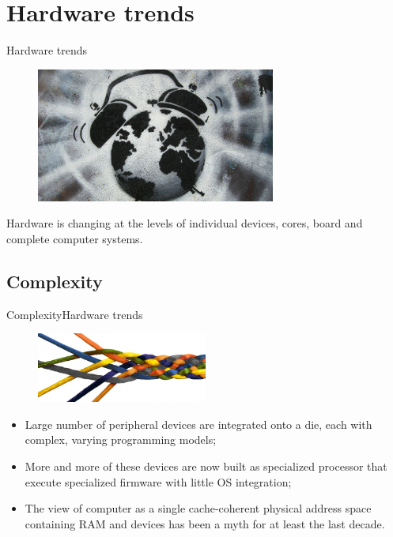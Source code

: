 \documentclass[10pt]{beamer}
\begin{document}
\section{Hardware trends}
\begin{frame}{Hardware trends}

  \begin{figure}[ht]
    \includegraphics[width=0.7\textwidth, keepaspectratio=true]{images/hwAndAppChangeFast.png}
  \end{figure}\pause

  \begin{block}{}
  Hardware is changing at the levels of individual devices, cores, board and
  complete computer systems.
  \end{block}

\end{frame}
\subsection{Complexity}

\begin{frame}{Complexity}{Hardware trends}

  \begin{figure}[ht]
    \includegraphics[width=0.5\textwidth, keepaspectratio=true]{images/integrated.jpg}
  \end{figure}\pause

  \begin{itemize}
    \item Large number of peripheral devices are integrated onto a die, each
          with complex, varying programming models; \pause
    \item More and more of these devices are now built as specialized processor
          that execute specialized firmware with little OS integration; \pause
    \item The view of computer as a single cache-coherent physical address
          space containing RAM and devices has been a myth for at least the
          last decade.
  \end{itemize}
\end{frame}
\end{document}
